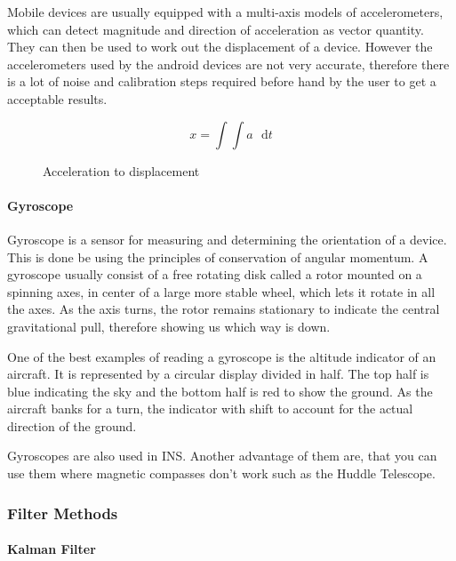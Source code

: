 Mobile devices are usually equipped with a multi-axis models of accelerometers,
which can detect magnitude and direction of acceleration as
vector quantity. They can then be used to work out the displacement
of a device. However the accelerometers used by the android devices
are not very accurate, therefore there is a lot of noise and calibration
steps required before hand by the user to get a acceptable results.

\begin{figure}[H]
\[
x=\int\int a\mathrm{\text{ }d}t
\]
 

\protect\caption{Acceleration to displacement}


\end{figure}



\paragraph{Gyroscope}

Gyroscope\cite{innertial_nav_sys} is a sensor for measuring and determining the orientation
of a device. This is done be using the principles of conservation
of angular momentum. A gyroscope usually consist of a free rotating
disk called a rotor mounted on a spinning axes, in center of a large
more stable wheel, which lets it rotate in all the axes. As the axis
turns, the rotor remains stationary to indicate the central gravitational
pull, therefore showing us which way is down.

One of the best examples of reading a gyroscope is the altitude indicator
of an aircraft. It is represented by a circular display divided in
half. The top half is blue indicating the sky and the bottom half
is red to show the ground. As the aircraft banks for a turn, the indicator
with shift to account for the actual direction of the ground.

Gyroscopes are also used in INS. Another advantage of them are, that
you can use them where magnetic compasses don't work such as the Huddle
Telescope\cite{gyroscope-wiki}.

\subsubsection{Filter Methods} \label{filter_methods}


\paragraph{Kalman Filter}
